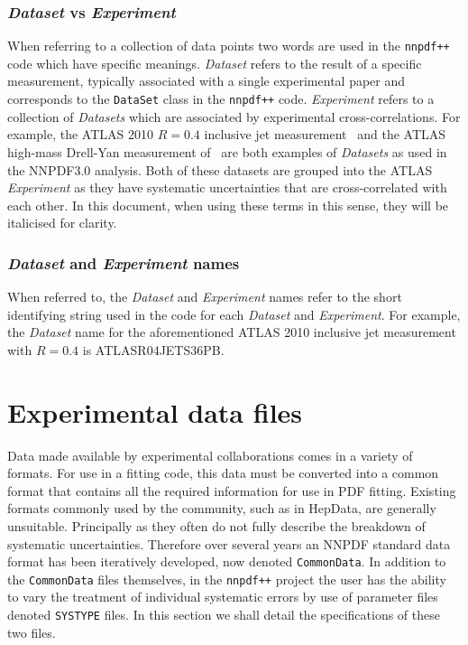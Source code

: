 \documentclass[11pt]{article}
\begin{document}
\subsubsection*{\emph{Dataset} vs \emph{Experiment}}
When referring to a collection of data points two words are used in the {\tt nnpdf++} code which have specific meanings.
\emph{Dataset} refers to the result of a specific measurement, typically associated with a single experimental paper and corresponds to the {\tt DataSet} class in the {\tt nnpdf++} code. \emph{Experiment} refers
to a collection of \emph{Datasets} which are associated by experimental cross-correlations. For example, the ATLAS 2010 $R=0.4$ inclusive jet measurement~\cite{Aad:2011fc}
and the ATLAS high-mass Drell-Yan measurement of~\cite{Aad:2013iua} are both examples of \emph{Datasets} as used in the NNPDF3.0 analysis. Both of these datasets are
grouped into the ATLAS \emph{Experiment} as they have systematic uncertainties that are cross-correlated with each other. In this document, when using these terms in
this sense, they will be italicised for clarity.

\subsubsection*{\emph{Dataset} and \emph{Experiment} names}
When referred to, the \emph{Dataset} and \emph{Experiment} names refer to the short identifying string used in the code for each \emph{Dataset} and \emph{Experiment}.
For example, the \emph{Dataset} name for the aforementioned ATLAS 2010 inclusive jet measurement with $R=0.4$ is \mbox{ATLASR04JETS36PB}.

\section{Experimental data files}\label{sec:experimental}
Data made available by experimental collaborations comes in a variety of formats. For use in a fitting code, this data must be converted into a common format
that contains all the required information for use in PDF fitting. Existing formats commonly used by the community, such as in HepData, are generally unsuitable.
Principally as they often do not fully describe the breakdown of systematic uncertainties. Therefore over several years an NNPDF standard data format has been
iteratively developed, now denoted {\tt CommonData}. In addition to the {\tt CommonData} files themselves, in the {\tt nnpdf++} project the user has the ability to vary
the treatment of individual systematic errors by use of parameter files denoted {\tt SYSTYPE} files. In this section we shall detail the specifications of these two files.
\end{document}
